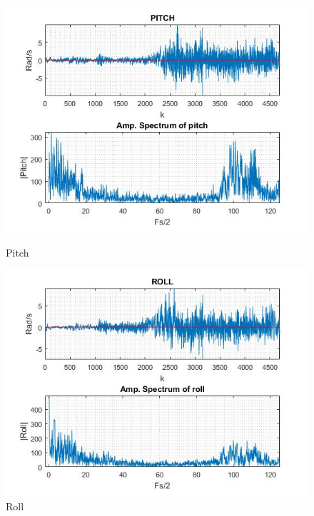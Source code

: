 \begin{figure}[H]
        \centering
            \begin{minipage}[b]{0.32\textwidth}
                \includegraphics[width = \textwidth, angle= 0]{NoisePictures/PITCH1.jpg}
                \caption{Pitch}
            \end{minipage}
            \hfill
            \begin{minipage}[b]{0.32\textwidth}
                \includegraphics[width =\textwidth, angle =0]{NoisePictures/ROLL1.jpg}
                \caption{Roll}
            \end{minipage}
            \hfill
            \begin{minipage}[b]{0.32\textwidth}

\end{minipage}
\end{figure}
